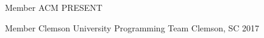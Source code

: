 

\begin{cvhonors}

  \cvhonor
    {Member} %
    {ACM} %
    {} %
    {PRESENT} %

  \cvhonor
    {Member} %
    {Clemson University Programming Team} %
    {Clemson, SC} %
    {2017} %

\end{cvhonors}
